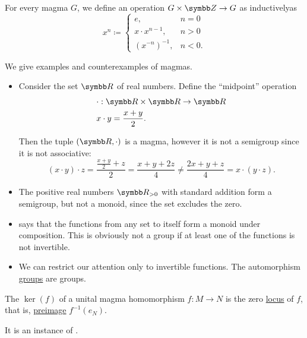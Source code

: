 \begin{Definition}\label{def:magma_exponentiation}
  For every magma \( G \), we define an operation \( G \times \BZ \to G \) as inductively\IND as
  \begin{equation*}
    x^n \coloneqq \begin{cases}
      e, &n = 0 \\
      x \cdot x^{n-1}, &n > 0 \\
      (x^{-n})^{-1}, &n < 0.
    \end{cases}
  \end{equation*}
\end{Definition}

\begin{Example}\label{ex:magmas}
  We give examples and counterexamples of magmas.

  \begin{itemize}
    \item Consider the set \( \BR \) of real numbers. Define the \enquote{midpoint} operation
    \begin{align*}
      &\cdot: \BR \times \BR \to \BR \\
      &x \cdot y = \frac {x + y} 2.
    \end{align*}

    Then the tuple \( (\BR, \cdot) \) is a magma, however it is not a semigroup since it is not associative:
    \begin{equation*}
      (x \cdot y) \cdot z = \frac {{\frac {x + y} 2} + z} 2 = \frac {x + y + 2z} 4
      \neq
      \frac {2x + y + z} 4 = x \cdot (y \cdot z).
    \end{equation*}

    \item The positive real numbers \( \BR_{>0} \) with standard addition form a semigroup, but not a monoid, since the set excludes the zero.

    \item {} says that the functions from any set to itself form a monoid under composition. This is obviously not a group if at least one of the functions is not invertible.

    \item We can restrict our attention only to invertible functions. The automorphism \hyperref[def:automorphism_group]{groups} are groups.
  \end{itemize}
\end{Example}

\begin{Definition}\label{def:unital_magma_kernel}
  The  \( \ker(f) \) of a unital magma homomorphism \( f: M \to N \) is the zero \hyperref[def:zero_locus]{locus} of \( f \), that is, \hyperref[def:function/preimage]{preimage} \( f^{-1}(e_N) \).

  It is an instance of .
\end{Definition}

